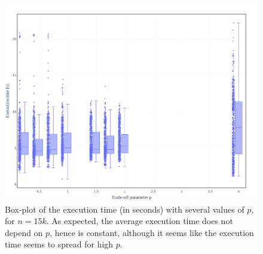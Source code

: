 \begin{figure}[h]
    \centering
    \includegraphics[width=\linewidth]{p_box_plot.png}
    \caption{Box-plot of the execution time (in seconds) with several values of $p$, for $n=15k$. As expected, the average execution time does not depend on $p$, hence is constant, although it seems like the execution time seems to spread for high $p$.}
    \label{fig:benchmark-p_bplot}
\end{figure}